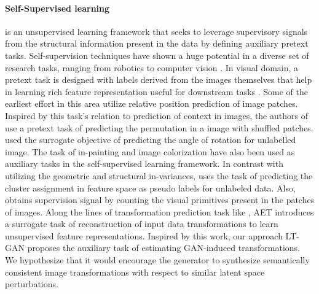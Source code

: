 \documentclass[10pt,twocolumn,letterpaper]{article}
\begin{document}
\paragraph{Self-Supervised learning} is an unsupervised learning framework that seeks to leverage supervisory signals from the structural information present in the data by defining auxiliary pretext tasks. Self-supervision techniques have shown a huge potential in a diverse set of research tasks, ranging from robotics to computer vision \cite{robot2018,crossmodal2018,multisensory2018,s2m22020,Spyros2018rotate}. In visual domain, a pretext task is designed with labels derived from the images themselves that help in learning rich feature representation useful for downstream tasks \cite{downstream2019abhinav}. Some of the earliest effort \cite{doersch2015seminal} in this area utilize relative position prediction of image patches. Inspired by this task's relation to prediction of context in images, the authors of \cite{Noroozi2018jigsaw,Nathan2018improve,Noroozi2018improve} use a pretext task of predicting the permutation in a image with shuffled patches. \cite{Spyros2018rotate} used the surrogate objective of predicting the angle of rotation for unlabelled image. The task of in-painting \cite{painting2018} and image colorization \cite{color2018,color_2018_1} have also been used as auxiliary tasks in the self-supervised learning framework. In contrast with utilizing the geometric and structural in-variances, \cite{cluster2018self} uses the task of predicting the cluster assignment in feature space as pseudo labels for unlabeled data. 
Also, \cite{Noroozi2017count} obtains supervision signal by counting the visual primitives present in the patches of images. Along the lines of transformation prediction task like \cite{Spyros2018rotate}, AET\cite{aet2019transformation} introduces a surrogate task of reconstruction of input data transformations to learn unsupervised feature representations. Inspired by this work, our approach LT-GAN proposes the auxiliary task of estimating GAN-induced transformations. We hypothesize that it would encourage the generator to synthesize semantically consistent image transformations with respect to similar latent space perturbations. 
\end{document}
